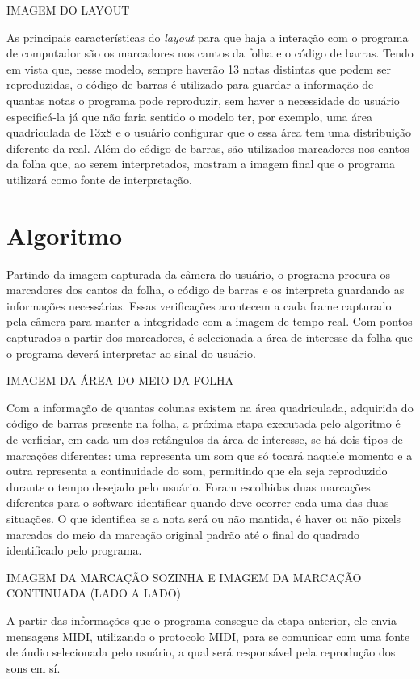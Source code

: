\documentclass[12pt]{report}
\begin{document}
IMAGEM DO LAYOUT

As principais características do {\it layout} para que haja a interação com o programa de computador são os  marcadores nos cantos da folha e o código de barras. Tendo em vista que, nesse modelo, sempre haverão 13 notas distintas que podem ser reproduzidas, o código de barras é utilizado para guardar a informação de quantas notas o programa pode reproduzir, sem haver a necessidade do usuário especificá-la já que não faria sentido o modelo ter, por exemplo, uma área quadriculada de 13x8 e o usuário configurar que o essa área tem uma distribuição diferente da real. Além do código de barras, são utilizados marcadores nos cantos da folha que, ao serem interpretados, mostram a imagem final que o programa utilizará como fonte de interpretação.

\chapter{Algoritmo}
\label{cha:fund-teor}

Partindo da imagem capturada da câmera do usuário, o programa procura os marcadores dos cantos da folha, o código de barras e os interpreta guardando as informações necessárias. Essas verificações acontecem a cada frame capturado pela câmera para manter a integridade com a imagem de tempo real.
Com pontos capturados a partir dos marcadores, é selecionada a área de interesse da folha que o programa deverá interpretar ao sinal do usuário.

IMAGEM DA ÁREA DO MEIO DA FOLHA

Com a informação de quantas colunas existem na área quadriculada, adquirida do código de barras presente na folha, a próxima etapa executada pelo algoritmo é de verficiar, em cada um dos retângulos da área de interesse, se há dois tipos de marcações diferentes: uma representa um som que só tocará naquele momento e a outra representa a continuidade do som, permitindo que ela seja reproduzido durante o tempo desejado pelo usuário. Foram escolhidas duas marcações diferentes para o software identificar quando deve ocorrer cada uma das duas situações. O que identifica se a nota será ou não mantida, é haver ou não pixels marcados do meio da marcação original padrão até o final do quadrado identificado pelo programa.

IMAGEM DA MARCAÇÃO SOZINHA E IMAGEM DA MARCAÇÃO CONTINUADA (LADO A LADO)

A partir das informações que o programa consegue da etapa anterior, ele envia mensagens MIDI, utilizando o protocolo MIDI, para se comunicar com uma fonte de áudio selecionada pelo usuário, a qual será responsável pela reprodução dos sons em sí.
\end{document}
